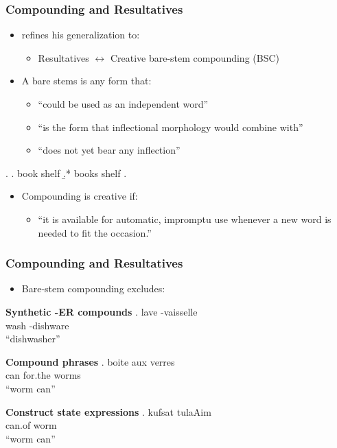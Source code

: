 \documentclass[Proposal]{subfiles}
\begin{document}
\begin{frame}
  \frametitle{Compounding and Resultatives}
  \begin{itemize}
    \item \textcite{snyder2016compound} refines his generalization to:
      \begin{itemize}
	\item Resultatives $\leftrightarrow$ Creative bare-stem compounding (BSC)
      \end{itemize}
    \item A bare stems is any form that:
      \begin{itemize}
	\item ``could be used as an independent word''
	\item ``is the  form that inflectional morphology would combine with''
	\item ``does not yet bear any inflection'' \hfill\parencite{snyder2016compound}
      \end{itemize}
  \end{itemize}
  \ex. 
  \a. {\rm book shelf}
  \b.* {\rm books shelf}
  \z.

  \begin{itemize}
    \item Compounding is creative if:
      \begin{itemize}
	\item ``it is available for automatic, impromptu use whenever a new word is needed to fit the occasion.'' \parencite{snyder2016compound}
      \end{itemize}
  \end{itemize}
\end{frame}
\begin{frame}
  \frametitle{Compounding and Resultatives}
  \begin{itemize}
    \item Bare-stem compounding excludes:
  \end{itemize}
  \begin{overprint}
    \textbf{Synthetic -ER compounds}
    \exg. lave -vaisselle \parencite[French,][]{snyder2016compound}\\
    wash -dishware\\
    ``dishwasher'' 

    \textbf{Compound phrases}
    \exg. boite aux verres \parencite[French,][]{snyder2016compound}\\
    can for.the worms\\
    ``worm can''

    \textbf{Construct state expressions}
    \exg. kufsat tulaAim \parencite[Hebrew,][]{snyder2016compound}\\
    can.of worm\\
    ``worm can''

  \end{overprint}
\end{frame}
\end{document}
